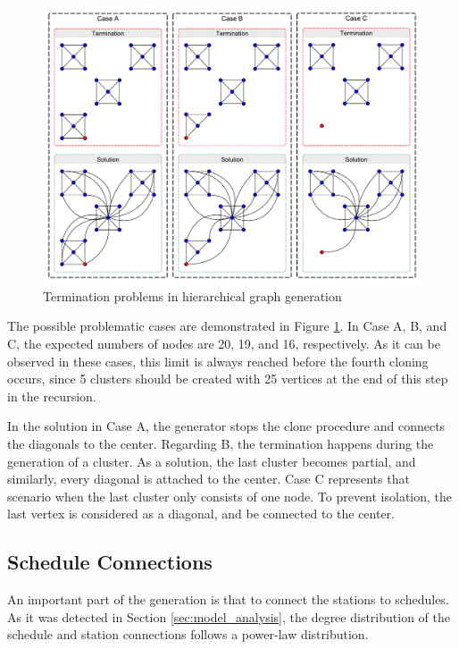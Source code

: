 \begin{figure}[!ht]
	\centering
	\includegraphics[width=150mm, keepaspectratio]{figures/hierarchical.pdf}
	\caption{Termination problems in hierarchical graph generation}
	\label{fig:hierarchical_problems}
\end{figure}

The possible problematic cases are demonstrated in Figure \ref{fig:hierarchical_problems}. In \textsf{Case A}, \textsf{B}, and \textsf{C}, the expected numbers of nodes are 20, 19, and 16, respectively. As it can be observed in these cases, this limit is always reached before the fourth cloning occurs, since 5 clusters should be created with 25 vertices at the end of this step in the recursion.

In the solution in \textsf{Case A}, the generator stops the clone procedure and connects the diagonals to the center. Regarding \textsf{B}, the termination happens during the generation of a cluster. As a solution, the last cluster becomes partial, and similarly, every diagonal is attached to the center. \textsf{Case C} represents that scenario when the last cluster only consists of one node. To prevent isolation, the last vertex is considered as a diagonal, and be connected to the center.

\subsection{Schedule Connections}\label{sec:schedule_connections}

An important part of the generation is that to connect the stations to schedules. As it was detected in Section \ref{sec:model_analysis}, the degree distribution of the schedule and station connections follows a power-law distribution. %

